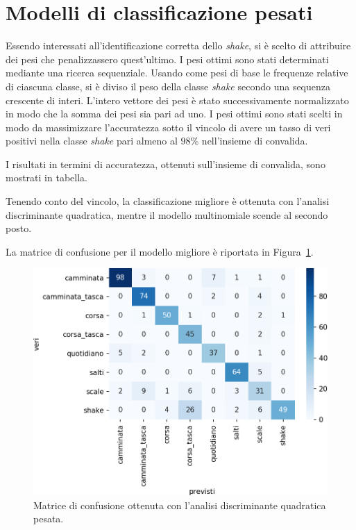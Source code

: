 \documentclass[main.tex]{subfiles}
\begin{document}
\section{Modelli di classificazione pesati}

Essendo interessati all\rq{}identificazione corretta dello {\em shake}, si è scelto di attribuire dei pesi che penalizzassero quest\rq{}ultimo. I pesi ottimi sono stati determinati mediante una ricerca sequenziale. Usando come pesi di base le frequenze relative di ciascuna classe, si è diviso il peso della classe {\em shake} secondo una sequenza crescente di interi. L'intero vettore dei pesi è stato successivamente normalizzato in modo che la somma dei pesi sia pari ad uno. I pesi ottimi sono stati scelti in modo da massimizzare l\rq{}accuratezza sotto il vincolo di avere un tasso di veri positivi nella classe {\em shake} pari almeno al $98\%$ nell\rq{}insieme di convalida.

I risultati in termini di accuratezza, ottenuti sull\rq{}insieme di convalida, sono mostrati in tabella.


Tenendo conto del vincolo, la classificazione migliore è ottenuta con l\rq{}analisi discriminante quadratica, mentre il modello multinomiale scende al secondo posto.

La matrice di confusione per il modello migliore è riportata in Figura~\ref{fig:qda_pen}.
\begin{figure}[H]
	\centering
	\includegraphics[width=\confusion]{../../figure/confusionMatrix-QDA-penalizzata.png}
	\caption{Matrice di confusione ottenuta con l'analisi discriminante quadratica pesata.}
	\label{fig:qda_pen}
\end{figure}
\end{document}

